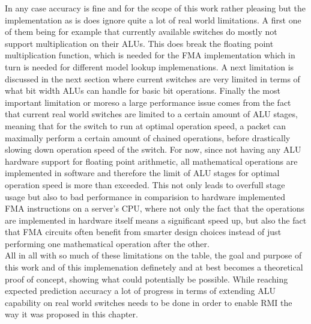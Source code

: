 In any case accuracy is fine and for the scope of this work rather pleasing but the implementation as is does ignore quite a lot of real world limitations. A first one of them being for example that currently available switches do mostly not support multiplication on their ALUs. This does break the floating point multiplication function, which is needed for the FMA implementation which in turn is needed for different model lookup implemenations. A next limitation is discussed in the next section where current switches are very limited in terms of what bit width ALUs can handle for basic bit operations. Finally the most important limitation or moreso a large performance issue comes from the fact that current real world switches are limited to a certain amount of ALU stages, meaning that for the switch to run at optimal operation speed, a packet can maximally perform a certain amount of chained operations, before drastically slowing down operation speed of the switch. For now, since not having any ALU hardware support for floating point arithmetic, all mathematical operations are implemented in software and therefore the limit of ALU stages for optimal operation speed is more than exceeded. This not only leads to overfull stage usage but also to bad performance in comparision to hardware implemented FMA instructions on a server's CPU, where not only the fact that the operations are implemented in hardware itself means a significant speed up, but also the fact that FMA circuits often benefit from smarter design choices instead of just performing one mathematical operation after the other.\\

All in all with so much of these limitations on the table, the goal and purpose of this work and of this implemenation definetely and at best becomes a theoretical proof of concept, showing what could potentially be possible. While reaching expected prediction accuracy a lot of progress in terms of extending ALU capability on real world switches needs to be done in order to enable RMI the way it was proposed in this chapter.

